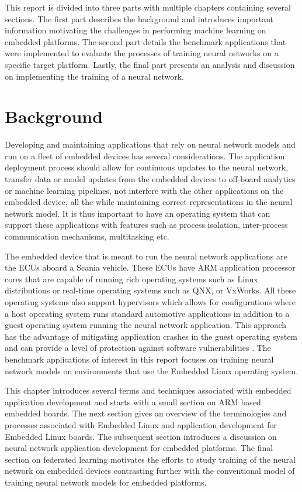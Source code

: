 This report is divided into three parts with multiple chapters containing several sections. The first part describes the background and introduces important information motivating the challenges in performing machine learning on embedded platforms. The second part details the benchmark applications that were implemented to evaluate the processes of training neural networks on a specific target platform. Lastly, the final part presents an analysis and discussion on implementing the training of a neural network.


\chapter{Background}

Developing and maintaining applications that rely on neural network models and run on a fleet of embedded devices has several considerations. The application deployment process should allow for continuous updates to the neural network, transfer data or model updates from the embedded devices to off-board analytics or machine learning pipelines, not interfere with the other applications on the embedded device, all the while maintaining correct representations in the neural network model. It is thus important to have an operating system that can support these applications with features such as process isolation, inter-process communication mechanisms, multitasking etc.

The embedded device that is meant to run the neural network applications are the ECUs aboard a Scania vehicle. These ECUs have ARM application processor cores that are capable of running rich operating systems such as Linux distributions or real-time operating systems such as QNX, or VxWorks. All these operating systems also support hypervisors which allows for configurations where a host operating system runs standard automotive applications in addition to a guest operating system running the neural network application. This approach has the advantage of mitigating application crashes in the guest operating system and can provide a level of protection against software vulnerabilities \cite{Linux-guest-os}. The benchmark applications of interest in this report focuses on training neural network models on environments that use the Embedded Linux operating system.

This chapter introduces several terms and techniques associated with embedded application development and starts with a small section on ARM based embedded boards. The next section gives an overview of the terminologies and processes associated with Embedded Linux and application development for Embedded Linux boards. The subsequent section introduces a discussion on neural network application development for embedded platforms. The final section on federated learning motivates the efforts to study training of the neural network on embedded devices contrasting further with the conventional model of training neural network models for embedded platforms.

